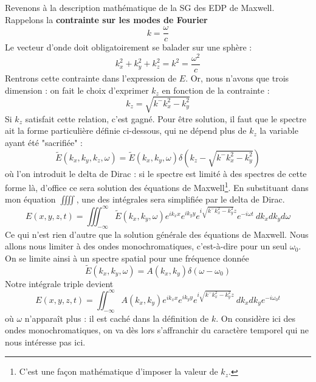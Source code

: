Revenons à la description mathématique de la SG des EDP de Maxwell. Rappelons la \textbf{contrainte 
sur les modes de Fourier} 
\begin{equation}
k = \dfrac{\omega}{c}
\end{equation}
Le vecteur d'onde doit obligatoirement se balader sur une sphère :
\begin{equation}
k_x^2+k_y^2+k_z^2 = k^2 = \dfrac{\omega^2}{c}
\end{equation}
Rentrons cette contrainte dans l'expression de $E$. Or, nous n'avons que trois dimension : on 
fait le choix d'exprimer $k_z$ en fonction de la contrainte :
\begin{equation}
k_z = \sqrt{k^-k_x^2-k_y^2}
\end{equation}
Si $k_z$ satisfait cette relation, c'est gagné. Pour être solution, il faut que le spectre ait 
la forme particulière définie ci-dessous, qui ne dépend plus de $k_z$ la variable ayant été 
"sacrifiée" :
\begin{equation}
\tilde{E}(k_x,k_y,k_z,\omega) = \tilde{E}(k_x,k_y,\omega)\delta\left(k_z-\sqrt{k^-k_x^2-k_y^2}\right)
\end{equation}
où l'on introduit le delta de Dirac : si le spectre est limité à des spectres de cette forme là, 
d'office ce sera solution des équations de Maxwell\footnote{C'est une façon mathématique d'imposer 
la valeur de $k_z$.}. En substituant dans mon équation $\iiiint$, une des intégrales sera simplifiée 
par le delta de Dirac.
\begin{equation}
E(x,y,z,t) = \iiint_{-\infty}^\infty \tilde{E}(k_x,k_y,\omega) e^{ik_xx}e^{ik_yy}e^{i 
\sqrt{k^-k_x^2-k_y^2} z}e^{-i\omega t}\ dk_xdk_yd\omega
\end{equation}
Ce qui n'est rien d'autre que la solution générale des équations de Maxwell. Nous allons nous limiter 
à des ondes monochromatiques, c'est-à-dire pour un seul $\omega_0$. On se limite ainsi à un spectre 
spatial pour une fréquence donnée
\begin{equation}
\tilde{E}(k_x,k_y,\omega) = A(k_x,k_y)\delta(\omega-\omega_0)
\end{equation}
Notre intégrale triple devient
\begin{equation}
E(x,y,z,t) = \iint_{-\infty}^\infty A(k_x,k_y) e^{ik_xx}e^{ik_yy}e^{i 
\sqrt{k^-k_x^2-k_y^2} z}\ dk_xdk_ye^{-i\omega_0 t}
\end{equation}
où $\omega$ n'apparaît plus : il est caché dans la définition de $k$. On considère ici des ondes 
monochromatiques, on va dès lors s'affranchir du caractère temporel qui ne nous intéresse pas ici. 
